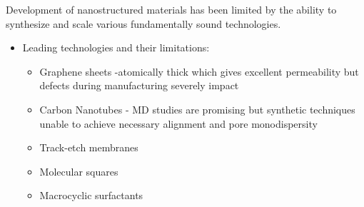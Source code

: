 \documentclass{article}
\begin{document}
	Development of nanostructured materials has been limited by the ability to synthesize and scale various fundamentally sound technologies.
	\begin{itemize}
		\item Leading technologies and their limitations:
		\begin{itemize}
			\item Graphene sheets -atomically thick which gives excellent permeability but defects during manufacturing severely impact 
			\item Carbon Nanotubes - MD studies are promising but synthetic techniques unable to achieve necessary alignment and pore monodispersity
			\item Track-etch membranes
		    \item Molecular squares
			\item Macrocyclic surfactants 
		\end{itemize}
	\end{itemize}
	  
\end{document}
